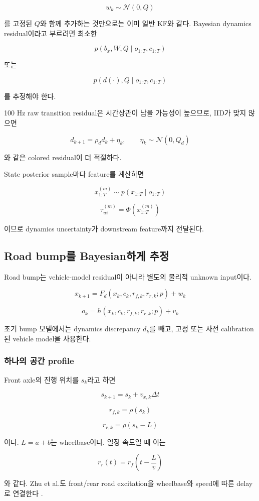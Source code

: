 \documentclass[letterpaper,10pt,journal,twocolumn]{ieeeconf}
\newcommand{\Normal}{\mathcal{N}}
\begin{document}
\[
w_k\sim\Normal(0,Q)
\]

를 고정된 \(Q\)와 함께 추가하는 것만으로는 이미 일반 KF와 같다. Bayesian dynamics residual이라고 부르려면 최소한

\[
p(b_x,W,Q\mid o_{1:T},c_{1:T})
\]

또는

\[
p(d(\cdot),Q\mid o_{1:T},c_{1:T})
\]

를 추정해야 한다.

100 Hz raw transition residual은 시간상관이 남을 가능성이 높으므로, IID가 맞지 않으면

\[
d_{k+1}
=
\rho_d d_k+\eta_k,
\qquad
\eta_k\sim\Normal(0,Q_d)
\]

와 같은 colored residual이 더 적절하다.

State posterior sample마다 feature를 계산하면

\[
x_{1:T}^{(m)}
\sim
p(x_{1:T}\mid o_{1:T})
\]

\[
\tau_{ui}^{(m)}
=
\Phi
\left(
x_{1:T}^{(m)}
\right)
\]

이므로 dynamics uncertainty가 downstream feature까지 전달된다.

\subsection{Road bump를 Bayesian하게 추정}

Road bump는 vehicle-model residual이 아니라 별도의 물리적 unknown input이다.

\[
x_{k+1}
=
F_d(x_k,c_k,r_{f,k},r_{r,k};p)
+w_k
\]

\[
o_k
=
h(x_k,c_k,r_{f,k},r_{r,k};p)
+v_k
\]

초기 bump 모델에서는 dynamics discrepancy \(d_k\)를 빼고, 고정 또는 사전 calibration된 vehicle model을 사용한다.

\subsubsection{하나의 공간 profile}

Front axle의 진행 위치를 \(s_k\)라고 하면

\[
s_{k+1}
=
s_k+v_{x,k}\Delta t
\]

\[
r_{f,k}
=
\rho(s_k)
\]

\[
r_{r,k}
=
\rho(s_k-L)
\]

이다. \(L=a+b\)는 wheelbase이다. 일정 속도일 때 이는

\[
r_r(t)
=
r_f
\left(
t-\frac{L}{v}
\right)
\]

와 같다. Zhu et al.도 front/rear road excitation을 wheelbase와 speed에 따른 delay로 연결한다 \cite{zhu2022}.
\end{document}
